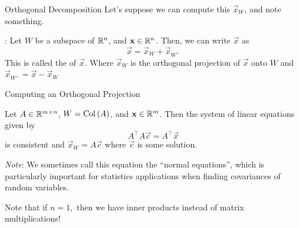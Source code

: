 \documentclass[xcoler=dvipsnames, aspectratio=169]{beamer}
\begin{document}
    \begin{frame}{Orthogonal Decomposition}
        Let's suppose we can compute this $\vec{x}_W$, and note something.\pause
        \begin{defn}
            :
            Let $W$ be a subspace of $\mathbb{R}^n$, and $\mathbf{x}\in\mathbb{R}^n$. Then, we can write $\vec{x}$
            as\pause
            \[
                \vec{x} = \vec{x}_W + \vec{x}_{W^\perp}
            \]\pause
            This is called the  of $\vec{x}$. Where $\vec{x}_W$ is
            the orthogonal projection of $\vec{x}$ onto $W$ and $\vec{x}_{W^\perp} = \vec{x}-\vec{x}_W$
        \end{defn}
    \end{frame}
    \begin{frame}{Computing an Orthogonal Projection}
        \begin{theorem}
            Let $A\in\mathbb{R}^{m\times n}$, $W = \mathrm{Col}\left(A\right)$, and $\mathbf{x}\in\mathbb{R}^{m}$. Then the system of
            linear equations given by
            \[
                A^\top A\vec{c} = A^\top\vec{x}
            \]
            is consistent and $\vec{x}_W = A\vec{c}$ where $\vec{c}$ is some solution.
        \end{theorem}\pause
        \emph{Note}: We sometimes call this equation the ``normal equations'', which is particularly
        important for statistics applications when finding covariances of random variables.\pause\

        Note that if $n=1,$ then we have inner products instead of matrix multiplications!
    \end{frame}
\end{document}
